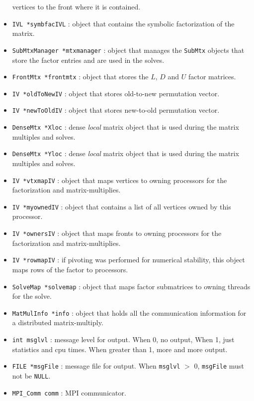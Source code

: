 \begin{itemize}
vertices to the front where it is contained.
\item
{\tt IVL *symbfacIVL} : object that contains the symbolic
factorization of the matrix.
\item
{\tt SubMtxManager *mtxmanager} : object that manages the
\texttt{SubMtx} objects that store the factor entries and are used
in the solves.
\item
{\tt FrontMtx *frontmtx} : object that stores the $L$, $D$ and $U$
factor matrices.
\item
{\tt IV *oldToNewIV} : object that stores old-to-new permutation vector.
\item
{\tt IV *newToOldIV} : object that stores new-to-old permutation vector.
\item
{\tt DenseMtx *Xloc} : dense {\it local} matrix object that is used 
during the matrix multiples and solves.
\item
{\tt DenseMtx *Yloc} : dense {\it local} matrix object that is used 
during the matrix multiples and solves.
\item
{\tt IV *vtxmapIV} : object that maps vertices to owning processors
for the factorization and matrix-multiplies.
\item
{\tt IV *myownedIV} : object that contains a list of all vertices
owned by this processor.
\item
{\tt IV *ownersIV} : object that maps fronts to owning processors
for the factorization and matrix-multiplies.
\item
{\tt IV *rowmapIV} : if pivoting was performed for numerical
stability, this object maps rows of the factor to processors.
\item
{\tt SolveMap *solvemap} : object that maps factor submatrices to
owning threads for the solve.
\item
{\tt MatMulInfo *info} : object that holds all the communication
information for a distributed matrix-multiply.
\item
{\tt int msglvl} : message level for output.
When 0, no output, When 1, just statistics and cpu times.
When greater than 1, more and more output.
\item
{\tt FILE *msgFile} : message file for output.
When \texttt{msglvl} $>$ 0, \texttt{msgFile} must not be \texttt{NULL}.
\item
{\tt MPI\_Comm comm} : MPI communicator.
\end{itemize}
\par
